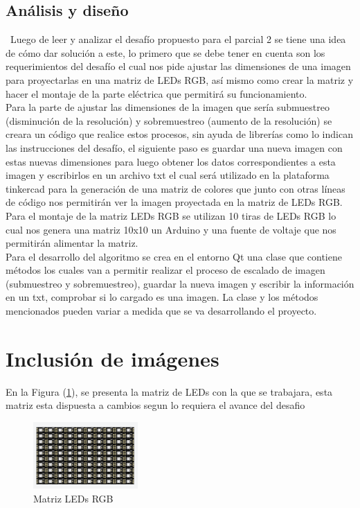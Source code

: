 \documentclass{article}
\begin{document}
\subsection{Análisis y diseño}
\
Luego de leer y analizar el desafío propuesto para el parcial 2 se tiene una idea de cómo dar solución a este, lo primero que se debe tener en cuenta son los requerimientos del desafío el cual nos pide ajustar las dimensiones de una imagen para proyectarlas en una matriz de LEDs RGB, así mismo como crear la matriz y hacer el montaje de la parte eléctrica que permitirá su funcionamiento.\\
Para la parte de ajustar las dimensiones de la imagen que sería submuestreo (disminución de la resolución) y sobremuestreo (aumento de la resolución) se creara un código que realice estos procesos, sin ayuda de librerías como lo indican las instrucciones del desafío, el siguiente paso es guardar una nueva imagen con estas nuevas dimensiones para luego obtener los datos correspondientes a esta imagen y escribirlos en un archivo txt el cual será utilizado en la plataforma tinkercad para la generación de una matriz de colores que junto con otras líneas de código nos permitirán ver la imagen proyectada en la matriz de LEDs RGB.\\
Para el montaje de la matriz LEDs RGB se utilizan 10 tiras de LEDs RGB lo cual nos genera una matriz 10x10 un Arduino y una fuente de voltaje que nos permitirán alimentar la matriz.\\
Para el desarrollo del algoritmo se crea en el entorno Qt una clase que contiene métodos los cuales van a permitir realizar el proceso de escalado de imagen (submuestreo y sobremuestreo), guardar la nueva imagen y escribir la información en un txt, comprobar si lo cargado es una imagen. La clase y los métodos mencionados pueden variar a medida que se va desarrollando el proyecto.


\section{Inclusión de imágenes} \label{imagenes}

En la Figura (\ref{fig:Matriz leds.png}), se presenta la matriz de LEDs con la que se trabajara, esta matriz esta dispuesta a cambios segun lo requiera el avance del desafio 

\begin{figure}[h]
\includegraphics[width=4cm]{Matriz leds.png}
\centering
\caption{Matriz LEDs RGB}
\label{fig:Matriz leds.png}
\end{figure}
\end{document}

